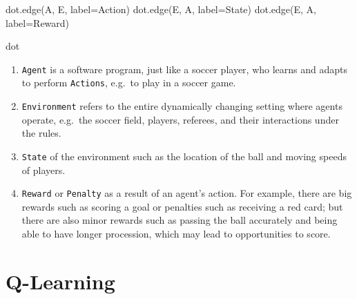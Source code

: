 \documentclass[
  letterpaper,
]{scrbook}
\newenvironment{Shaded}{\begin{snugshade}}{\end{snugshade}}
\newcommand{\NormalTok}[1]{\textcolor[rgb]{0.00,0.23,0.31}{#1}}
\newcommand{\OperatorTok}[1]{\textcolor[rgb]{0.37,0.37,0.37}{#1}}
\newcommand{\StringTok}[1]{\textcolor[rgb]{0.13,0.47,0.30}{#1}}
\providecommand{\tightlist}{%
  \setlength{\itemsep}{0pt}\setlength{\parskip}{0pt}}
\begin{document}
\begin{Shaded}
\begin{Highlighting}[]
\NormalTok{dot.edge(}\StringTok{\textquotesingle{}A\textquotesingle{}}\NormalTok{, }\StringTok{\textquotesingle{}E\textquotesingle{}}\NormalTok{, label}\OperatorTok{=}\StringTok{\textquotesingle{}Action\textquotesingle{}}\NormalTok{)}
\NormalTok{dot.edge(}\StringTok{\textquotesingle{}E\textquotesingle{}}\NormalTok{, }\StringTok{\textquotesingle{}A\textquotesingle{}}\NormalTok{, label}\OperatorTok{=}\StringTok{\textquotesingle{}State\textquotesingle{}}\NormalTok{)}
\NormalTok{dot.edge(}\StringTok{\textquotesingle{}E\textquotesingle{}}\NormalTok{, }\StringTok{\textquotesingle{}A\textquotesingle{}}\NormalTok{, label}\OperatorTok{=}\StringTok{\textquotesingle{}Reward\textquotesingle{}}\NormalTok{)}
\end{Highlighting}
\end{Shaded}

\begin{Shaded}
\begin{Highlighting}[]
\NormalTok{dot}
\end{Highlighting}
\end{Shaded}

\begin{enumerate}
\def\labelenumi{\arabic{enumi}.}
\tightlist
\item
  \texttt{Agent} is a software program, just like a soccer player, who
  learns and adapts to perform \texttt{Actions}, e.g.~to play in a
  soccer game.
\item
  \texttt{Environment} refers to the entire dynamically changing setting
  where agents operate, e.g.~the soccer field, players, referees, and
  their interactions under the rules.
\item
  \texttt{State} of the environment such as the location of the ball and
  moving speeds of players.
\item
  \texttt{Reward} or \texttt{Penalty} as a result of an agent's action.
  For example, there are big rewards such as scoring a goal or penalties
  such as receiving a red card; but there are also minor rewards such as
  passing the ball accurately and being able to have longer procession,
  which may lead to opportunities to score.
\end{enumerate}

\section*{Q-Learning}\label{q-learning}

\end{document}
